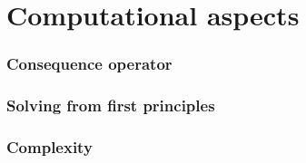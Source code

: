\part{Computational aspects}
\section{Consequence operator}

\section{Solving from first principles}

\section{Complexity}

%
